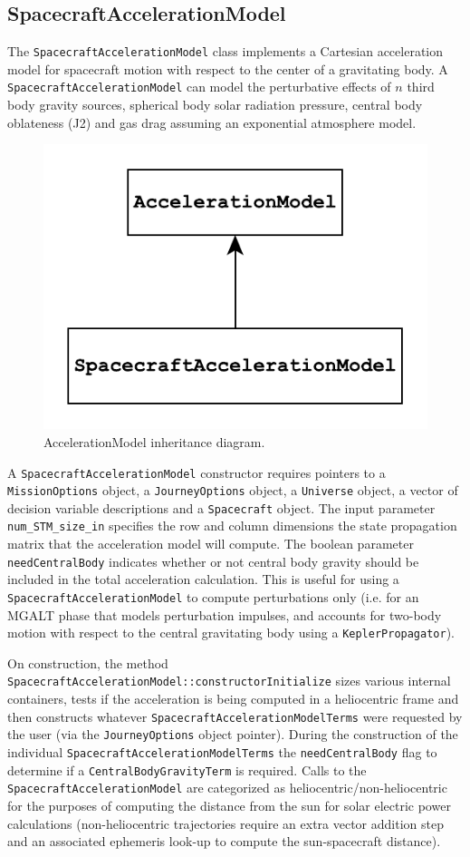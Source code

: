 \subsection{SpacecraftAccelerationModel}
\label{sec:spacecraft_acceleration_model}

The \texttt{SpacecraftAccelerationModel} class implements a Cartesian acceleration model for spacecraft motion with respect to the center of a gravitating body. A \texttt{SpacecraftAccelerationModel} can model the perturbative effects of $n$ third body gravity sources, spherical body solar radiation pressure, central body oblateness (J2) and gas drag assuming an exponential atmosphere model.

\begin{figure}[h!]
    \centering
    \includegraphics[width=0.3\linewidth]{./astrodynamics/AccelerationModel_inheritance.pdf}
    \caption{\label{fig:AccelerationModel_inheritance} AccelerationModel inheritance diagram.}
\end{figure} 

A \texttt{SpacecraftAccelerationModel} constructor requires pointers to a \texttt{MissionOptions} object, a \texttt{JourneyOptions} object, a \texttt{Universe} object, a vector of decision variable descriptions and a \texttt{Spacecraft} object. The input parameter \texttt{num\_STM\_size\_in} specifies the row and column dimensions the state propagation matrix that the acceleration model will compute. The boolean parameter \texttt{needCentralBody} indicates whether or not central body gravity should be included in the total acceleration calculation. This is useful for using a \texttt{SpacecraftAccelerationModel} to compute perturbations only (i.e. for an MGALT phase that models perturbation impulses, and accounts for two-body motion with respect to the central gravitating body using a \texttt{KeplerPropagator}).

On construction, the method \texttt{SpacecraftAccelerationModel::constructorInitialize} sizes various internal containers, tests if the acceleration is being computed in a heliocentric frame and then constructs whatever \texttt{SpacecraftAccelerationModelTerms} were requested by the user (via the \texttt{JourneyOptions} object pointer). During the construction of the individual \texttt{SpacecraftAccelerationModelTerms} the \texttt{needCentralBody} flag to determine if a \texttt{CentralBodyGravityTerm} is required. Calls to the \texttt{SpacecraftAccelerationModel} are categorized as heliocentric/non-heliocentric for the purposes of computing the distance from the sun for solar electric power calculations (non-heliocentric trajectories require an extra vector addition step and an associated ephemeris look-up to compute the sun-spacecraft distance).

